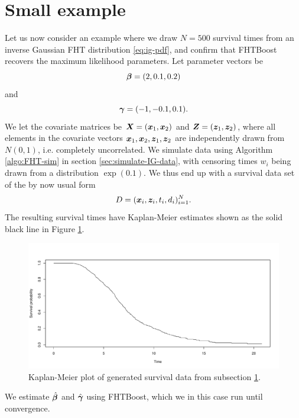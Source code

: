 \section{Small example}
\label{subsec:algo-example}
Let us now consider an example where we draw $N=500$ survival times from an inverse Gaussian FHT distribution \eqref{eq:ig-pdf}, and confirm that FHTBoost recovers the maximum likelihood parameters.
Let parameter vectors be
\begin{equation*}
    \boldsymbol{\beta}=(2,0.1,0.2)
\end{equation*}
and
\begin{equation*}
    \boldsymbol{\gamma}=(-1, -0.1, 0.1).
\end{equation*}
We let the covariate matrices be $\bm{X}=(\bm{x}_1,\bm{x}_2)$ and $\bm{Z}=(\bm{z}_1,\bm{z}_2)$, where all elements in the covariate vectors $\bm{x}_1,\bm{x}_2,\bm{z}_1,\bm{z}_2$ are independently drawn from $N(0,1)$, i.e. completely uncorrelated.
We simulate data using Algorithm \ref{algo:FHT-sim} in section \ref{sec:simulate-IG-data}, with censoring times $w_i$ being drawn from a distribution $\exp(0.1)$.
We thus end up with a survival data set of the by now usual form
\begin{equation*}
    D=(\bm{x}_i,\bm{z}_i,t_i,d_i)_{i=1}^N.
\end{equation*}
The resulting survival times have Kaplan-Meier estimates shown as the solid black line in Figure \ref{fig:small-example-kaplan-meier}.
\begin{figure}
\caption{Kaplan-Meier plot of generated survival data from subsection \ref{subsec:algo-example}.}
\label{fig:small-example-kaplan-meier}
\centering\includegraphics[scale=0.4]{figures/kaplan_meier_small.pdf}
\end{figure}
We estimate $\hat{\boldsymbol{\beta}}$ and $\hat{\boldsymbol{\gamma}}$ using FHTBoost, which we in this case run until convergence.
